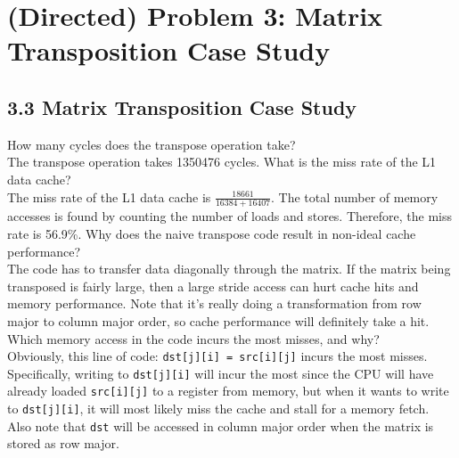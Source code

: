 \documentclass[11pt]{article}
\begin{document}
\section*{(Directed) Problem 3: Matrix Transposition Case Study}


\subsection*{3.3 Matrix Transposition Case Study}
\begin{Parts}
	\Part How many cycles does the transpose operation take? \\
	The transpose operation takes 1350476 cycles.
	\Part What is the miss rate of the L1 data cache? \\
	The miss rate of the L1 data cache is $\frac{18661}{16384 + 16407}$. The total number of memory accesses is found by counting the number of loads and stores. Therefore, the miss rate is 56.9\%.
	\Part Why does the naive transpose code result in non-ideal cache performance? \\
	The code has to transfer data diagonally through the matrix. If the matrix being transposed is fairly large, then a large stride access can hurt cache hits and memory performance. Note that it's really doing a transformation from row major to column major order, so cache performance will definitely take a hit.
	\Part Which memory access in the code incurs the most misses, and why? \\
	Obviously, this line of code: \verb|dst[j][i] = src[i][j]| incurs the most misses. Specifically, writing to \verb|dst[j][i]| will incur the most since the CPU will have already loaded \verb|src[i][j]| to a register from memory, but when it wants to write to \verb|dst[j][i]|, it will most likely miss the cache and stall for a memory fetch. Also note that \verb|dst| will be accessed in column major order when the matrix is stored as row major.
\end{Parts}
\newpage

\end{document}
